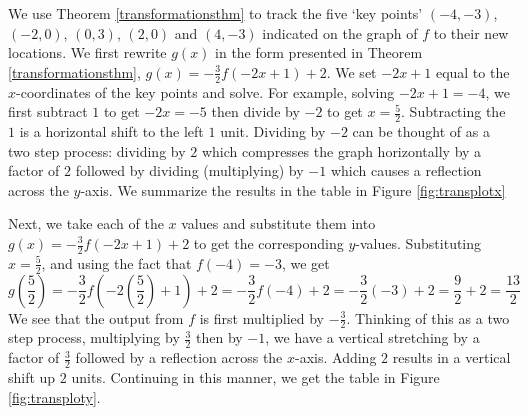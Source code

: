 {
We use Theorem \ref{transformationsthm} to track the five `key points' $(-4,-3)$, $(-2,0)$, $(0,3)$, $(2,0)$ and $(4,-3)$ indicated on the graph of $f$ to their new locations.  We first rewrite $g(x)$ in the form presented in Theorem \ref{transformationsthm}, $g(x) = -\frac{3}{2}f(-2x+1) +2$.  We set $-2x+1$ equal to the $x$-coordinates of the key points and solve.  For example, solving $-2x+1 = -4$, we first subtract $1$ to get $-2x = -5$ then divide by $-2$ to get $x = \frac{5}{2}$. Subtracting the $1$ is a horizontal shift to the left $1$ unit.  Dividing by $-2$ can be thought of as a two step process:  dividing by $2$ which compresses the graph horizontally by a factor of $2$ followed by dividing (multiplying) by $-1$ which causes a reflection across the $y$-axis.  We summarize the results in the table in Figure \ref{fig:transplotx}



Next, we take each of the $x$ values and substitute them into $g(x) = -\frac{3}{2}f(-2x+1) +2$ to get the corresponding $y$-values.  Substituting  $x=\frac{5}{2}$, and using the fact that $f(-4)=-3$, we get \[g\left(\frac{5}{2}\right) = -\frac{3}{2}f\left(-2\left(\frac{5}{2}\right) +1\right) +2 = -\frac{3}{2} f(-4) + 2 = -\frac{3}{2}(-3) + 2 = \frac{9}{2} + 2 = \frac{13}{2}\]  We see that the output from $f$ is first multiplied by $-\frac{3}{2}$.  Thinking of this as a two step process, multiplying by $\frac{3}{2}$ then by $-1$, we have  a vertical stretching by a factor of $\frac{3}{2}$ followed by a reflection across the $x$-axis.  Adding $2$ results in a vertical shift up $2$ units.  Continuing in this manner, we get the table in Figure \ref{fig:transploty}.

}
